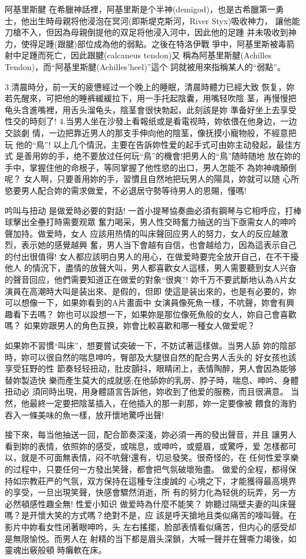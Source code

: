 \documentclass[12pt,UTF8]{ctexbook}
\begin{document}
阿基里斯腱
在希臘神話裡，阿基里斯是个半神(demigod)，也是古希臘第一勇
士，他出生時母親将他浸泡在冥河(即斯堤克斯河，River Styx)吸收神力，
讓他能刀槍不入，但因為母親倒提他的双足将他浸入河中，因此他的足踵
并未吸收到神力，使得足踵(跟腱)部位成為他的弱點。之後在特洛伊戰
爭中，阿基里斯被毒箭射中足踵而死亡，因此跟腱(calcaneus tendon)又
稱為阿基里斯腱(Achilles Tendon)，而“阿基里斯腱(Achilles'heel)”這个
詞就被用來指稱某人的“弱點”。

3.清晨時分，前一天的疲憊經过一个晚上的睡眠，清晨時體力已經大致
恢复，妳若先醒來，可把他的睡裤緩緩拉下，用一手托起陰囊，用嘴轻吹陰
茎，再慢慢把龟头含進嘴裡，用舌头溜龟头，陰茎會很快勃起，此刻該是妳
準备好坐上去享受性交的時刻了!
4.当男人坐在沙發上看報纸或是看電视時，妳依偎在他身边，一边交談劇
情，一边把靠近男人的那支手伸向他的陰茎，像抚摸小寵物般，不經意把玩
他的“鳥”!
以上几个情況，主要在告訴妳性爱的起手式可由妳主动發起，最佳方式
是善用妳的手，绝不要放过任何玩“鳥”的機會!把男人的“鳥”随時随地
放在妳的手中，掌握住他的命根子，等同掌握了他性慾的出口，男人怎能不
為妳神魂顛倒呢？
女人啊，只要善用妳的手，習慣且自然地把玩男人的陽具，妳就可以随
心所慾要男人配合妳的需求做爱，不必退居守勢等待男人的恩賜，懂嗎!

吟叫与扭动
是做爱時必要的對話!
一首小提琴協奏曲必須有鋼琴与它相呼应，打棒球擊出全壘打時需要观眾
奮力喝采，男人性交時奮力抽送的当下亟需女人的呻吟聲加持。做爱時，女人
应該用热情的叫床聲回应男人的努力，女人的反应越激烈，表示她的感覺越興
奮，男人当下會越有自信，也會越给力，因為這表示自己的付出很值得!
女人都应該明白男人的用心，在做爱時要完全放开自己，在不干擾他人
的情況下，盡情的放聲大叫，男人都喜歡女人這樣，男人需要聽到女人兴奋
的聲音回应，他們需要知道正在做爱的對象“很爽”!
妳千万不要武斷地认為A片女演員在高潮時大叫是装出來、是假的，但即
使這是装出來的，也是有必要的，妳可以想像一下，如果妳看到的A片畫面中
女演員像死魚一樣，不吭聲，妳會有興趣看下去嗎？
妳也可以設想一下，如果妳是那位像死魚般的女人，妳自己會喜歡嗎？
如果妳跟男人的角色互换，妳會比較喜歡和哪一種女人做爱呢？

如果妳不習慣“叫床”，想要嘗试突破一下，不妨试著這樣做。当男人舔
妳的陰部時，妳可以很自然的喘息呻吟，臀部及大腿很自然的配合男人舌头的
好女孩也該享受狂野的性
節奏轻轻扭动，肚皮顫抖，眼睛闭上，表情陶醉，男人會因為能够替妳製造快
樂而產生莫大的成就感;在他舔妳的乳房、脖子時，喘息、呻吟、身體扭动必
須同時出現，用身體語言告訴他，妳收到了他爱的服務，而且很满意。
当然，他最終一定要把陰茎插入，在他插入的那一刹那，妳一定要像被
餵食的海豹吞入一條美味的魚一樣，放开懷地驚呼出聲!

接下來，每当他抽送一回，配合節奏深淺，妳必須一再的發出聲音，并且
讓男人看到妳的表情，依照妳的感受，或喘息，或呻吟，或蹙眉，或驚呼，爱
怎樣都可以，就是不可面無表情，闷不吭聲!還有，切忌發笑。很奇怪的，在
任何性爱享樂的过程中，只要任何一方發出笑聲，都會把气氛破壞殆盡。
做爱的全程，都得保持如宗教莊严的气氛，双方保持在這種专注虔誠的
心境之下，才能獲得最高境界的享受，一旦出現笑聲，快感會驟然消逝，所
有的努力化為轻佻的玩弄，另一方必然頓感性趣全無!
性爱小知识
做爱時為什麼不能笑？
妳聽过隔壁夫妻的叫床聲嗎？是开懷大笑的方式嗎？绝對不是，应
該是呼天搶地且类似痛苦的嚎叫聲。在影片中妳看女性闭著眼呻吟，头
左右搖擺，脸部表情看似痛苦，但内心的感受却是無限愉悦。而男人在
射精的当下都是眉头深鎖，大喊一聲并在聲嘶力竭後，如靈魂出竅般頓
時癱軟在床。
\end{document}
